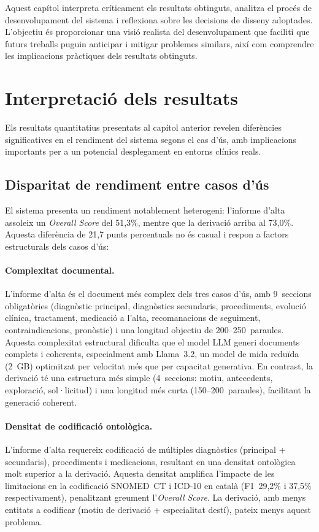 \documentclass[CAT]{TFUOC}%
\begin{document}
Aquest capítol interpreta críticament els resultats obtinguts, analitza el procés de desenvolupament del sistema i reflexiona sobre les decisions de disseny adoptades. L'objectiu és proporcionar una visió realista del desenvolupament que faciliti que futurs treballs puguin anticipar i mitigar problemes similars, així com comprendre les implicacions pràctiques dels resultats obtinguts.

\section{Interpretació dels resultats}

Els resultats quantitatius presentats al capítol anterior revelen diferències significatives en el rendiment del sistema segons el cas d'ús, amb implicacions importants per a un potencial desplegament en entorns clínics reals.

\subsection{Disparitat de rendiment entre casos d'ús}

El sistema presenta un rendiment notablement heterogeni: l'informe d'alta assoleix un \textit{Overall Score} del 51,3\%, mentre que la derivació arriba al 73,0\%. Aquesta diferència de 21,7 punts percentuals no és casual i respon a factors estructurals dels casos d'ús:

\paragraph{Complexitat documental.}
L'informe d'alta és el document més complex dels tres casos d'ús, amb 9~seccions obligatòries (diagnòstic principal, diagnòstics secundaris, procediments, evolució clínica, tractament, medicació a l'alta, recomanacions de seguiment, contraindicacions, pronòstic) i una longitud objectiu de 200--250~paraules. Aquesta complexitat estructural dificulta que el model LLM generi documents complets i coherents, especialment amb Llama~3.2, un model de mida reduïda (2~GB) optimitzat per velocitat més que per capacitat generativa. En contrast, la derivació té una estructura més simple (4~seccions: motiu, antecedents, exploració, sol·licitud) i una longitud més curta (150--200~paraules), facilitant la generació coherent.

\paragraph{Densitat de codificació ontològica.}
L'informe d'alta requereix codificació de múltiples diagnòstics (principal + secundaris), procediments i medicacions, resultant en una densitat ontològica molt superior a la derivació. Aquesta densitat amplifica l'impacte de les limitacions en la codificació SNOMED~CT i ICD-10 en català (F1~29,2\% i 37,5\% respectivament), penalitzant greument l'\textit{Overall Score}. La derivació, amb menys entitats a codificar (motiu de derivació + especialitat destí), pateix menys aquest problema.
\end{document}
